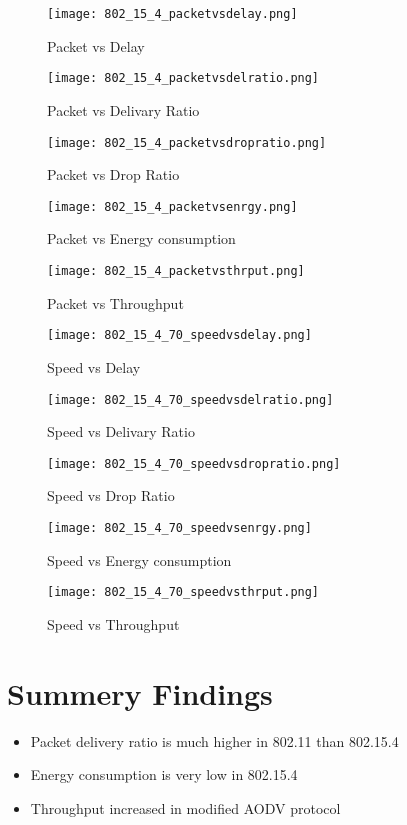 \documentclass{report}
\begin{document}
\begin{figure}
  \caption{Packet vs Delay}
  \centering
    \texttt{[image: 802\_15\_4\_packetvsdelay.png]}
\end{figure}
\begin{figure}
  \caption{Packet vs Delivary Ratio}
  \centering
    \texttt{[image: 802\_15\_4\_packetvsdelratio.png]}
\end{figure}
\begin{figure}
  \caption{Packet vs Drop Ratio}
  \centering
    \texttt{[image: 802\_15\_4\_packetvsdropratio.png]}
\end{figure}
\begin{figure}
  \caption{Packet vs Energy consumption}
  \centering
    \texttt{[image: 802\_15\_4\_packetvsenrgy.png]}
\end{figure}
\begin{figure}
  \caption{Packet vs Throughput}
  \centering
    \texttt{[image: 802\_15\_4\_packetvsthrput.png]}
\end{figure}

\begin{figure}
  \caption{Speed vs Delay}
  \centering
    \texttt{[image: 802\_15\_4\_70\_speedvsdelay.png]}
\end{figure}
\begin{figure}
  \caption{Speed vs Delivary Ratio}
  \centering
    \texttt{[image: 802\_15\_4\_70\_speedvsdelratio.png]}
\end{figure}
\begin{figure}
  \caption{Speed vs Drop Ratio}
  \centering
    \texttt{[image: 802\_15\_4\_70\_speedvsdropratio.png]}
\end{figure}
\begin{figure}
  \caption{Speed vs Energy consumption}
  \centering
    \texttt{[image: 802\_15\_4\_70\_speedvsenrgy.png]}
\end{figure}
\begin{figure}
  \caption{Speed vs Throughput}
  \centering
    \texttt{[image: 802\_15\_4\_70\_speedvsthrput.png]}
\end{figure}
\chapter{Summery Findings}
 
\begin{itemize}
  \item Packet delivery ratio is much higher in 802.11 than 802.15.4
  \item Energy consumption is very low in 802.15.4
  \item Throughput increased in modified AODV protocol
\end{itemize}
\end{document}

